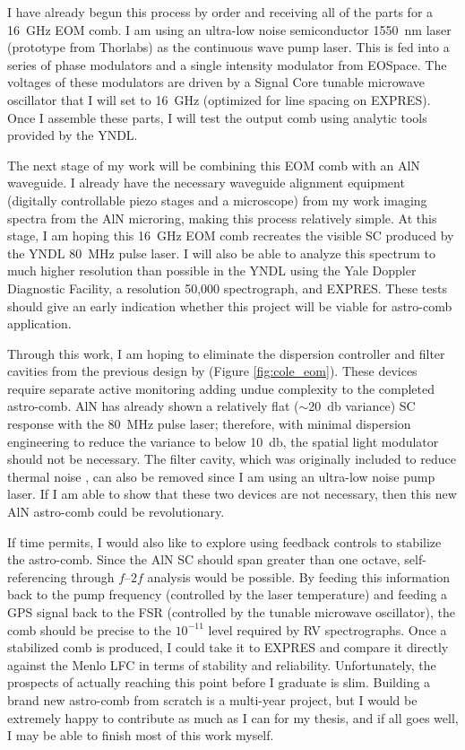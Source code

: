 \documentclass[11pt]{article}
\begin{document}
I have already begun this process by order and receiving all of the parts for a \SI{16}{\giga\hertz} EOM comb. I am using an ultra-low noise semiconductor \SI{1550}{\nano\meter} laser (prototype from Thorlabs) as the continuous wave pump laser. This is fed into a series of phase modulators and a single intensity modulator from EOSpace. The voltages of these modulators are driven by a Signal Core tunable microwave oscillator that I will set to \SI{16}{\giga\hertz} (optimized for line spacing on EXPRES). Once I assemble these parts, I will test the output comb using analytic tools provided by the YNDL.

The next stage of my work will be combining this EOM comb with an AlN waveguide. I already have the necessary waveguide alignment equipment (digitally controllable piezo stages and a microscope) from my work imaging spectra from the AlN microring, making this process relatively simple. At this stage, I am hoping this \SI{16}{\giga\hertz} EOM comb recreates the visible SC produced by the YNDL \SI{80}{\mega\hertz} pulse laser. I will also be able to analyze this spectrum to much higher resolution than possible in the YNDL using the Yale Doppler Diagnostic Facility, a resolution 50,000 spectrograph, and EXPRES. These tests should give an early indication whether this project will be viable for astro-comb application.

Through this work, I am hoping to eliminate the dispersion controller and filter cavities from the previous design by \citet{Cole2015} (Figure \ref{fig:cole_eom}). These devices require separate active monitoring adding undue complexity to the completed astro-comb. AlN has already shown a relatively flat ($\sim$\SI{20}{\decibel} variance) SC response with the \SI{80}{\mega\hertz} pulse laser; therefore, with minimal dispersion engineering to reduce the variance to below \SI{10}{\decibel}, the spatial light modulator should not be necessary. The filter cavity, which was originally included to reduce thermal noise \citep{Carlson2017a}, can also be removed since I am using an ultra-low noise pump laser. If I am able to show that these two devices are not necessary, then this new AlN astro-comb could be revolutionary.

If time permits, I would also like to explore using feedback controls to stabilize the astro-comb. Since the AlN SC should span greater than one octave, self-referencing through $f$--$2f$ analysis would be possible. By feeding this information back to the pump frequency (controlled by the laser temperature) and feeding a GPS signal back to the FSR (controlled by the tunable microwave oscillator), the comb should be precise to the $10^{-11}$ level required by RV spectrographs. Once a stabilized comb is produced, I could take it to EXPRES and compare it directly against the Menlo LFC in terms of stability and reliability. Unfortunately, the prospects of actually reaching this point before I graduate is slim. Building a brand new astro-comb from scratch is a multi-year project, but I would be extremely happy to contribute as much as I can for my thesis, and if all goes well, I may be able to finish most of this work myself.
\end{document}
